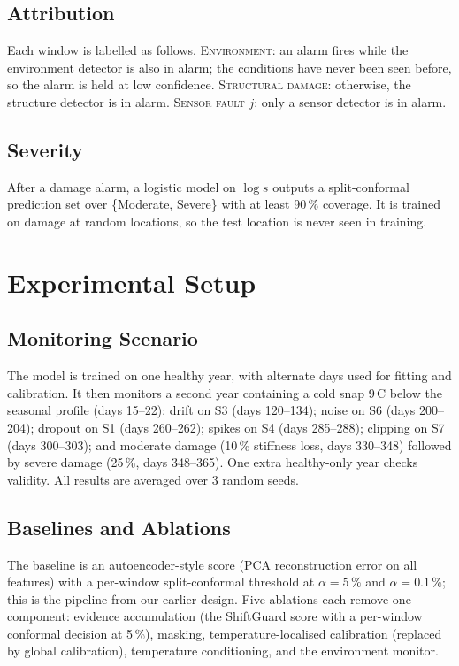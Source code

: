 \documentclass[conference]{IEEEtran}
\begin{document}
\subsection{Attribution}
Each window is labelled as follows. \textsc{Environment}: an alarm fires while the environment detector is also in alarm; the conditions have never been seen before, so the alarm is held at low confidence. \textsc{Structural damage}: otherwise, the structure detector is in alarm. \textsc{Sensor fault} $j$: only a sensor detector is in alarm.

\subsection{Severity}
After a damage alarm, a logistic model on $\log s$ outputs a split-conformal prediction set over \{Moderate, Severe\} with at least 90\,\% coverage. It is trained on damage at random locations, so the test location is never seen in training.

\section{Experimental Setup}
\subsection{Monitoring Scenario}
The model is trained on one healthy year, with alternate days used for fitting and calibration. It then monitors a second year containing a cold snap 9\,\textdegree C below the seasonal profile (days 15--22); drift on S3 (days 120--134); noise on S6 (days 200--204); dropout on S1 (days 260--262); spikes on S4 (days 285--288); clipping on S7 (days 300--303); and moderate damage (10\,\% stiffness loss, days 330--348) followed by severe damage (25\,\%, days 348--365). One extra healthy-only year checks validity. All results are averaged over 3 random seeds.

\subsection{Baselines and Ablations}
The baseline is an autoencoder-style score (PCA reconstruction error on all features) with a per-window split-conformal threshold at $\alpha=5\,\%$ and $\alpha=0.1\,\%$; this is the pipeline from our earlier design. Five ablations each remove one component: evidence accumulation (the ShiftGuard score with a per-window conformal decision at 5\,\%), masking, temperature-localised calibration (replaced by global calibration), temperature conditioning, and the environment monitor.
\end{document}
